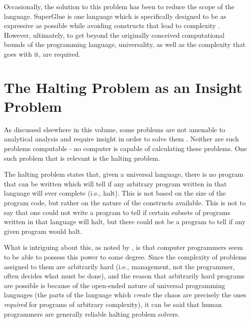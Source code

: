 Occasionally, the solution to this problem has been to reduce the scope of the language.  SuperGlue is one language which is specifically designed to be as expressive as possible while avoiding constructs that lead to complexity \citep{mcdirmid}.  However, ultimately, to get beyond the originally conceived computational bounds of the programming language, universality, as well as the complexity that goes with it, are required.

\section{The Halting Problem as an Insight Problem}

As discussed elsewhere in this volume, some problems are not amenable to analytical analysis and require insight in order to solve them \citep{bartlett1, holloway}.  Neither are such problems computable - no computer is capable of calculating these problems.  One such problem that is relevant is the halting problem.

The halting problem states that, given a universal language, there is no program that can be written which will tell if any arbitrary program written in that language will ever complete (i.e., halt).  This is not based on the size of the program code, but rather on the nature of the constructs available.  This is not to say that one could not write a program to tell if certain subsets of programs written in that language will halt, but there could not be a program to tell if any given program would halt.

What is intriguing about this, as noted by \citet{bartlett1}, is that computer programmers seem to be able to possess this power to some degree.  Since the complexity of problems assigned to them are arbitrarily hard (i.e., management, not the programmer, often decides what must be done), and the reason that arbitrarily hard programs are possible is because of the open-ended nature of universal programming languages (the parts of the language which \textit{create} the chaos are precisely the ones \textit{required} for programs of arbitrary complexity), it can be said that human programmers are generally reliable halting problem solvers.

